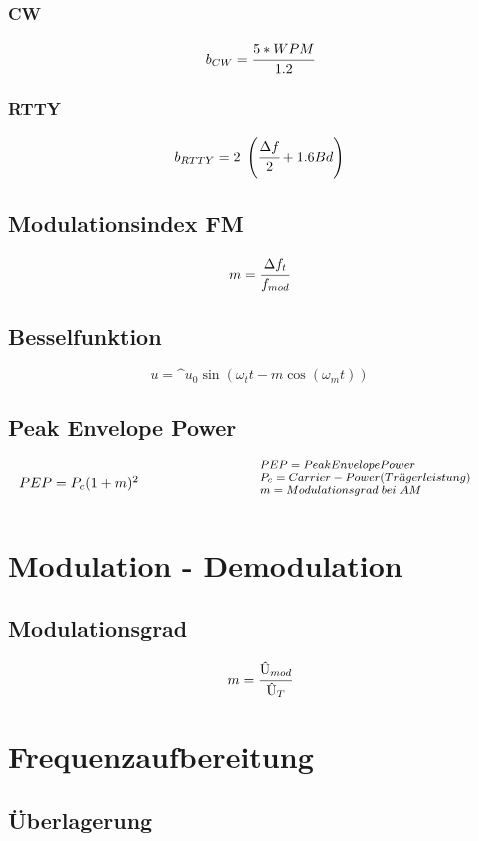 \documentclass[12pt,a5paper,ngerman,titlepage]{article}
\begin{document}
\subsubsection{CW}
$$b_{CW} = \cfrac{5*WPM}{1.2}$$

\subsubsection{RTTY}
$$b_{RTTY}=2\; \left(\cfrac{\Delta f}{2}+1.6 Bd\right)$$

\subsection{Modulationsindex FM}
$$m=\cfrac{\Delta f_{t}}{f_{mod}}$$

\subsection{Besselfunktion}
$$u = \^u_{0}\sin(\omega_{t}t-m\cos(\omega_{m}t))$$

\subsection{Peak Envelope Power}
\[
\begin{minipage}{.5\linewidth}
  $PEP = P_{c}(1+m)^2$ 
\end{minipage}%
\begin{minipage}{.5\linewidth}
  \fontsize{8pt}{9pt}\selectfont
  $PEP = Peak Envelope Power$ \\
  $P_{c} = Carrier-Power(Tr\ddot{a}gerleistung)$ \\
  $m = Modulationsgrad \; bei \; AM$ \\
\end{minipage}
\]

\newpage
\section{Modulation - Demodulation}
\subsection{Modulationsgrad}
$$m = \cfrac{\text{\^{U}}_{mod}}{\text{\^{U}}_{T}}$$

\newpage
\section{Frequenzaufbereitung}
\subsection{Überlagerung}
\end{document}
